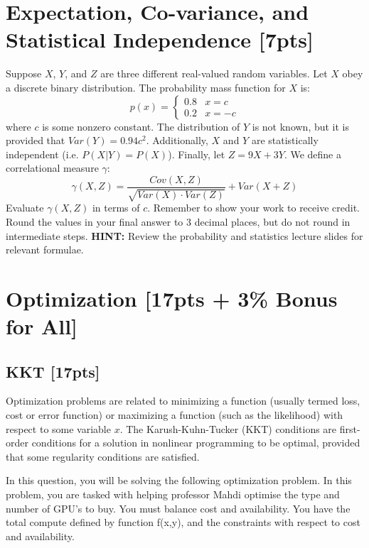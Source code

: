 \documentclass{article}
\begin{document}
\newpage



\section{Expectation, Co-variance, and Statistical Independence [7pts]}
Suppose $X$, $Y$, and $Z$ are three different real-valued random variables.
\bigbreak
\noindent Let $X$ obey a discrete binary distribution. The probability mass function for $X$ is:
$$p(x)=\begin{cases}
    0.8 & x = c\\
    0.2 & x = -c
\end{cases}$$
where $c$ is some nonzero constant. The distribution of $Y$ is not known, but it is provided that $Var(Y) = 0.94c^2$. Additionally, $X$ and $Y$ are statistically independent (i.e. $P(X|Y) = P(X)$). Finally, let $Z = 9X + 3Y$.
\bigbreak
\noindent We define a correlational measure $\gamma$:
$$\gamma(X,Z)=\frac{Cov(X,Z)}{\sqrt{Var(X)\cdot Var(Z)}} + Var(X+Z)$$
Evaluate $\gamma(X,Z)$ in terms of $c$. Remember to show your work to receive credit. Round the values in your final answer to 3 decimal places, but do not round in intermediate steps. 
\bigbreak
\noindent\textbf{HINT:} Review the probability and statistics lecture slides for relevant formulae.
\bigbreak

\newpage
\section{Optimization [17pts + 3\% Bonus for All]}

\subsection{KKT [17pts]}
Optimization problems are related to minimizing a function (usually termed loss, cost or error function) or maximizing a function (such as the likelihood) with respect to some variable $x$. The Karush-Kuhn-Tucker (KKT) conditions are first-order conditions for a solution in nonlinear programming to be optimal, provided that some regularity conditions are satisfied. 

In this question, you will be solving the following optimization problem. In this problem, you are tasked with helping professor Mahdi optimise the type and number of GPU's to buy. You must balance cost and availability. You have the total compute defined by function f(x,y), and the constraints with respect to cost and availability.
\end{document}
